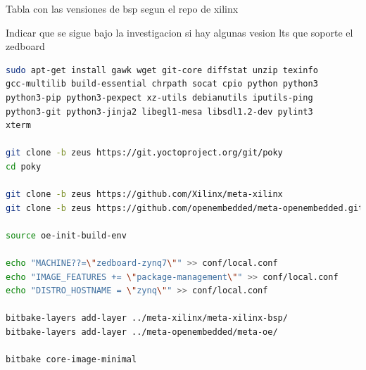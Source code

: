 \documentclass[12pt,letterpaper]{article}
\begin{document}
\begin{table}[h!]
    \caption{}
    \label{tab:my-table}
    \end{table}
Tabla con las vensiones de bsp segun el repo de xilinx

Indicar que se sigue bajo la investigacion si hay algunas vesion lts que soporte el zedboard

\begin{lstlisting}[language=bash]
sudo apt-get install gawk wget git-core diffstat unzip texinfo 
gcc-multilib build-essential chrpath socat cpio python python3 
python3-pip python3-pexpect xz-utils debianutils iputils-ping 
python3-git python3-jinja2 libegl1-mesa libsdl1.2-dev pylint3
xterm

git clone -b zeus https://git.yoctoproject.org/git/poky
cd poky

git clone -b zeus https://github.com/Xilinx/meta-xilinx
git clone -b zeus https://github.com/openembedded/meta-openembedded.git

source oe-init-build-env

echo "MACHINE??=\"zedboard-zynq7\"" >> conf/local.conf
echo "IMAGE_FEATURES += \"package-management\"" >> conf/local.conf
echo "DISTRO_HOSTNAME = \"zynq\"" >> conf/local.conf

bitbake-layers add-layer ../meta-xilinx/meta-xilinx-bsp/
bitbake-layers add-layer ../meta-openembedded/meta-oe/

bitbake core-image-minimal
\end{lstlisting}
\end{document}
